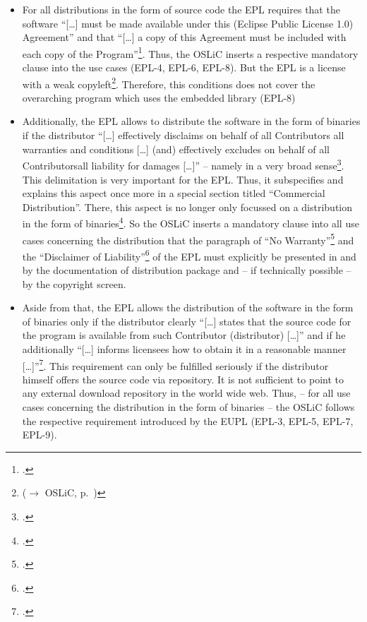 \begin{itemize}
  \item For all distributions in the form of source code the EPL requires that
  the software \enquote{[\ldots] must be made available under this (Eclipse
  Public License 1.0) Agreement} and that \enquote{[\ldots] a copy of this
  Agreement must be included with each copy of the
  Program}\footcite[cf.][\nopage wp.\ §3]{Epl10OsiLicense2005a}. Thus, the OSLiC
  inserts a respective mandatory clause into the use cases (EPL-4, EPL-6,
  EPL-8). But the EPL is a license with a weak copyleft\footnote{($\rightarrow$
  OSLiC, p.\ \pageref{sec:ProtectingPowerOfEpl})}. Therefore, this conditions
  does not cover the overarching program which uses the embedded library (EPL-8)
  
  \item Additionally, the EPL allows to distribute the software in the form
  of binaries if the distributor \enquote{[\ldots] effectively disclaims on
  behalf of all Contributors all warranties and conditions [\ldots] (and)
  effectively excludes on behalf of all Contributorsall liability for damages
  [\ldots]} -- namely in a very broad sense\footcite[cf.][\nopage wp.\
  §3]{Epl10OsiLicense2005a}. This delimitation is very important for the EPL.
  Thus, it subspecifies and explains this aspect once more in a special section
  titled \enquote{Commercial Distribution}. There, this aspect is no longer only
  focussed on a distribution in the form of binaries\footcite[cf.][\nopage wp.\
  §4]{Epl10OsiLicense2005a}. So the OSLiC inserts a mandatory clause into all
  use cases concerning the distribution that the paragraph of \enquote{No
  Warranty}\footcite[cf.][\nopage wp.\ §5]{Epl10OsiLicense2005a} and the
  \enquote{Disclaimer of Liability}\footcite[cf.][\nopage wp.\
  §6]{Epl10OsiLicense2005a} of the EPL must explicitly be presented in and by
  the documentation of distribution package
  and -- if technically possible -- by the copyright screen.
  
  \item Aside from that, the EPL allows the distribution of the software in the
  form of binaries only if the distributor clearly \enquote{[\ldots] states that
  the source code for the program is available from such Contributor
  (distributor) [\ldots]} and if he additionally \enquote{[\ldots] informs
  licensees how to obtain it in a reasonable manner
  [\ldots]}\footcite[cf.][\nopage wp.\ §3]{Epl10OsiLicense2005a}. This
  requirement can only be fulfilled seriously if the distributor himself offers
  the source code via repository. It is not sufficient to point to any external
  download repository in the world wide web. Thus, -- for all use cases
  concerning the distribution in the form of binaries -- the OSLiC follows the
  respective requirement introduced by the EUPL (EPL-3, EPL-5, EPL-7, EPL-9).
  

\end{itemize}
